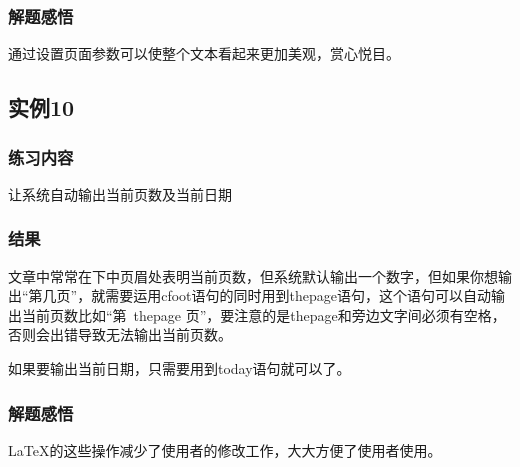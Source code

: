 \documentclass{ctexart}
\begin{document}
\subsubsection{解题感悟}
通过设置页面参数可以使整个文本看起来更加美观，赏心悦目。
\subsection{实例10}
\subsubsection{练习内容}
让系统自动输出当前页数及当前日期
\subsubsection{结果}
文章中常常在下中页眉处表明当前页数，但系统默认输出一个数字，但如果你想输出“第几页”，就需要运用cfoot语句的同时用到thepage语句，这个语句可以自动输出当前页数比如“第\ thepage 页”，要注意的是thepage和旁边文字间必须有空格，否则会出错导致无法输出当前页数。

如果要输出当前日期，只需要用到today语句就可以了。
\subsubsection{解题感悟}
LaTeX的这些操作减少了使用者的修改工作，大大方便了使用者使用。
\end{document}
